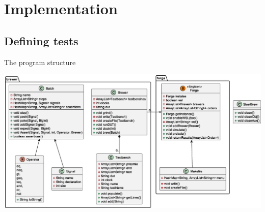 \documentclass[aspectratio=169, handout]{beamer}
\begin{document}
\section{Implementation}
\subsection{Defining tests}
\begin{frame}{The program structure}
    \begin{center}
        \includegraphics[height=.8\textheight]{out/plantuml/classDiag/classDiag.eps}
    \end{center}
\end{frame}
\end{document}
